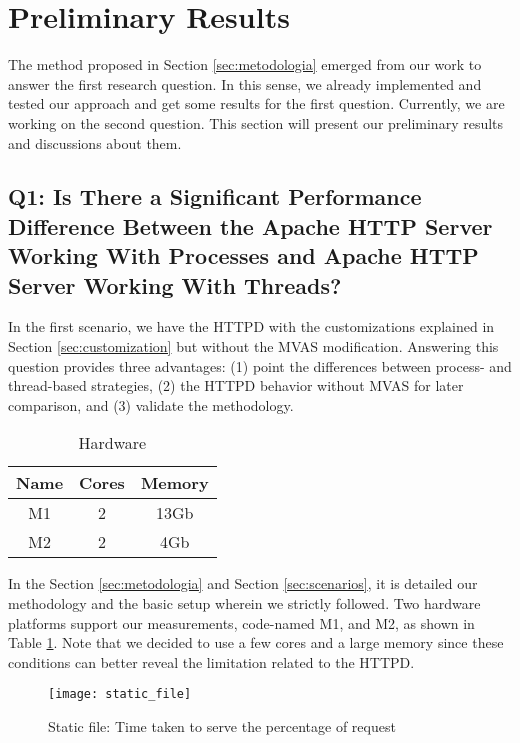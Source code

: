 \section{Preliminary Results}
\label{sec:preliminary}

The method proposed in Section \ref{sec:metodologia} emerged from
our work to answer the first research question. In this sense, we already
implemented and tested our approach and get some results for the first
question. Currently, we are working on the second question. This section will
present our preliminary results and discussions about them.

\subsection{Q1: Is There a Significant Performance Difference Between the Apache HTTP Server Working With Processes and Apache HTTP Server Working With Threads?}
 
In the first scenario, we have the HTTPD with the customizations explained in
Section \ref{sec:customization} but without the MVAS modification. Answering
this question provides three advantages: (1) point the differences between
process- and thread-based strategies, (2) the HTTPD behavior without MVAS for
later comparison, and (3) validate the methodology.
 
\begin{table}[h!]
  \centering
  \begin{tabular}{|c|c|c|}
    \hline
    Name & \textbf{Cores} & \textbf{Memory}\\
    \hline
    M1 & 2 & 13Gb \\
    \hline
    M2 & 2 & 4Gb \\
    \hline
  \end{tabular}
  \caption{Hardware}
  \label{tab:machines}
\end{table}

In the Section \ref{sec:metodologia} and Section
\ref{sec:scenarios}, it is detailed our methodology and the basic setup wherein
we strictly followed. Two hardware platforms support our measurements,
code-named M1, and M2, as shown in Table \ref{tab:machines}. Note that we
decided to use a few cores and a large memory since these conditions can better
reveal the limitation related to the HTTPD.
 
\begin{figure}[!h]
  \centering
  \texttt{[image: static\_file]}
  \caption{Static file: Time taken to serve the percentage of request}
  \label{fig:static_file}
\end{figure}

